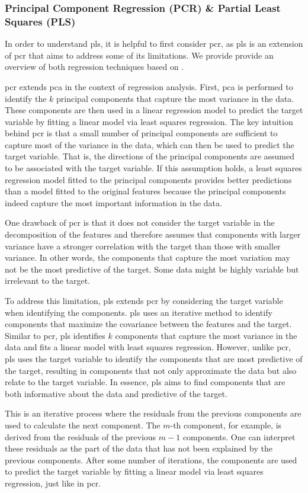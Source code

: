 \subsubsection{Principal Component Regression (PCR) \& Partial Least Squares (PLS)}\label{subsec:pls}
In order to understand \gls{pls}, it is helpful to first consider \gls{pcr}, as \gls{pls} is an extension of \gls{pcr} that aims to address some of its limitations.
We provide provide an overview of both regression techniques based on \citet{James2023AnIS}.

\gls{pcr} extends \gls{pca} in the context of regression analysis.
First, \gls{pca} is performed to identify the $k$ principal components that capture the most variance in the data.
These components are then used in a linear regression model to predict the target variable by fitting a linear model via least squares regression.
The key intuition behind \gls{pcr} is that a small number of principal components are sufficient to capture most of the variance in the data, which can then be used to predict the target variable.
That is, the directions of the principal components are assumed to be associated with the target variable.
If this assumption holds, a least squares regression model fitted to the principal components provides better predictions than a model fitted to the original features because the principal components indeed capture the most important information in the data.

One drawback of \gls{pcr} is that it does not consider the target variable in the decomposition of the features and therefore assumes that components with larger variance have a stronger correlation with the target than those with smaller variance. In other words, the components that capture the most variation may not be the most predictive of the target. Some data might be highly variable but irrelevant to the target.

To address this limitation, \gls{pls} extends \gls{pcr} by considering the target variable when identifying the components.
\gls{pls} uses an iterative method to identify components that maximize the covariance between the features and the target.
Similar to \gls{pcr}, \gls{pls} identifies $k$ components that capture the most variance in the data and fits a linear model with least squares regression.
However, unlike \gls{pcr}, \gls{pls} uses the target variable to identify the components that are most predictive of the target, resulting in components that not only approximate the data but also relate to the target variable.
In essence, \gls{pls} aims to find components that are both informative about the data and predictive of the target.

This is an iterative process where the residuals from the previous components are used to calculate the next component.
The $m$-th component, for example, is derived from the residuals of the previous $m-1$ components.
One can interpret these residuals as the part of the data that has not been explained by the previous components.
After some number of iterations, the components are used to predict the target variable by fitting a linear model via least squares regression, just like in \gls{pcr}.